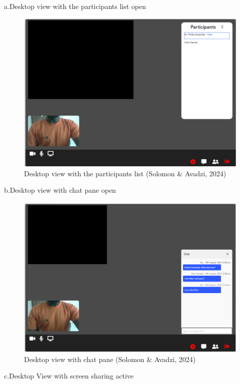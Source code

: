\documentclass[a4paper,12pt]{article}  %
\begin{document}
a.Desktop view with the participants list open\\
\begin{figure}[H]
      \centering
      \includegraphics[width=1\textwidth]{figures/d-participants-open.png}
      \caption{Desktop view with the participants list (Solomon \& Avadzi, 2024)}
\end{figure}
b.Desktop view with chat pane open\\
\begin{figure}[H]
      \centering
      \includegraphics[width=1\textwidth]{figures/d-chats-open.png}
      \caption{Desktop view with chat pane  (Solomon \& Avadzi, 2024)}
\end{figure}
c.Desktop View with screen sharing active\\
\end{document}
